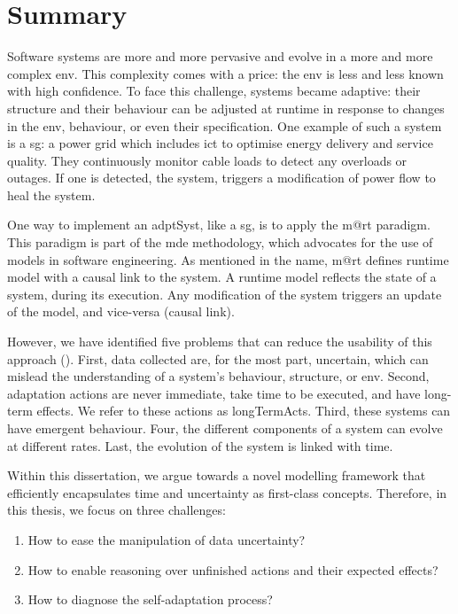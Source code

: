 \section{Summary}

Software systems are more and more pervasive and evolve in a more and more complex \gls{env}.
This complexity comes with a price: the \gls{env} is less and less known with high confidence.
To face this challenge, systems became adaptive: their \gls{structure} and their \gls{behaviour} can be adjusted at runtime in response to changes in the \gls{env}, \gls{behaviour}, or even their specification.
One example of such a system is a \gls{sg}: a power grid which includes \gls{ict} to optimise energy delivery and service quality.
They continuously monitor cable loads to detect any overloads or outages.
If one is detected, the system, triggers a modification of power flow to heal the system.

One way to implement an \gls{adptSyst}, like a \gls{sg}, is to apply the \gls{m@rt} paradigm.
This paradigm is part of the \gls{mde} methodology, which advocates for the use of \glspl{model} in software engineering.
As mentioned in the name, \gls{m@rt} defines runtime \gls{model} with a causal link to the system.
A runtime \gls{model} reflects the state of a system, during its execution.
Any modification of the system triggers an update of the \gls{model}, and vice-versa (causal link).

However, we have identified five problems that can reduce the usability of this approach (\cf {}).
First, data collected are, for the most part, uncertain, which can mislead the understanding of a system's \gls{behaviour}, \gls{structure}, or \gls{env}.
Second, adaptation \glspl{action} are never immediate, take time to be executed, and have long-term effects.
We refer to these \glspl{action} as \glspl{longTermAct}.
Third, these systems can have emergent \gls{behaviour}.
Four, the different components of a system can evolve at different rates.
Last, the evolution of the system is linked with time.

Within this dissertation, we argue towards a novel modelling framework that efficiently encapsulates time and uncertainty as first-class concepts.
Therefore, in this thesis, we focus on three challenges:
\begin{enumerate}
	\vspace{-0.5em}
	\setlength\itemsep{-0.3em}
	\item How to ease the manipulation of data uncertainty?
	\item How to enable reasoning over unfinished actions and their expected effects?
	\item How to diagnose the self-adaptation process?
\end{enumerate}

